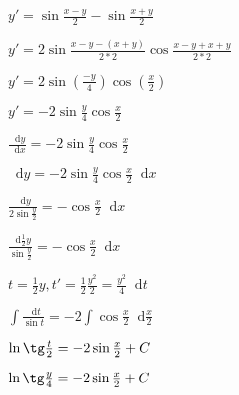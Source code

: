 \documentclass{article}
\newcommand*\diff{\mathop{}\!\mathrm{d}}
\begin{document}
\begin{minipage}{0.49\textwidth}
    $y' = \sin \frac{x - y}{2} - \sin \frac{x + y}{2}$

    $y' = 2 \sin \frac{x - y - (x + y)}{2 * 2} \cos \frac{x - y + x + y}{2 * 2}$

    $y' = 2 \sin (\frac{-y}{4}) \cos (\frac{x}{2})$

    $y' = -2 \sin \frac{y}{4} \cos \frac{x}{2}$

    $\frac{\diff y}{\diff x} = - 2 \sin \frac{y}{4} \cos \frac{x}{2}$

    $\diff y = -2 \sin \frac{y}{4} \cos \frac{x}{2} \diff x$

    $\frac{\diff y}{2 \sin \frac{y}{2}} = -\cos \frac{x}{2} \diff x$

    $\frac{\diff \frac{1}{2} y}{\sin \frac{y}{2}} = -\cos \frac{x}{2} \diff x$

    $t = \frac{1}{2} y, t' = \frac{1}{2} \frac{y^2}{2} = \frac{y^2}{4} \diff t$

    $\int \frac{\diff t}{\sin t} = - 2 \int \cos \frac{x}{2} \diff \frac{x}{2}$

    $\ln \tg \frac{t}{2} = - 2 \sin \frac{x}{2} + C$

    $\ln \tg \frac{y}{4} = - 2 \sin \frac{x}{2} + C$
\end{minipage}
\end{document}
